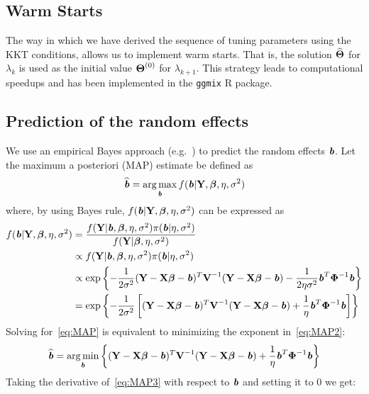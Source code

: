\subsection{Warm Starts}
The way in which we have derived the sequence of tuning parameters using the KKT conditions, allows us to implement warm starts. That is, the solution $\widehat{\boldsymbol{\Theta}}$ for $\lambda_k$ is used as the initial value $\boldsymbol{\Theta}^{(0)}$ for $\lambda_{k+1}$. This strategy leads to computational speedups and has been implemented in the \texttt{ggmix} R package. 

\subsection{Prediction of the random effects}
We use an empirical Bayes approach (e.g.~\cite{wakefield2013bayesian}) to predict the random effects $\textbf{\emph{b}}$. Let the maximum a posteriori (MAP) estimate be defined as
\begin{equation}
\widehat{\textbf{\emph{b}}} = \operatorname*{arg\,max}_{\textbf{\emph{b}}} f(\textbf{\emph{b}} |  \textbf{Y}, \boldsymbol{\beta}, \eta, \sigma^2)  \label{eq:MAP}
\end{equation}
where, by using Bayes rule, $f(\textbf{\emph{b}} |  \textbf{Y}, \boldsymbol{\beta}, \eta, \sigma^2)$ can be expressed as
\begin{align}
f(\textbf{\emph{b}} |  \textbf{Y}, \boldsymbol{\beta}, \eta, \sigma^2) & = \frac{f(\textbf{Y} | \textbf{\emph{b}},  \boldsymbol{\beta}, \eta, \sigma^2)  \pi(\textbf{\emph{b}} | \eta, \sigma^2)}{f(\textbf{Y} |  \boldsymbol{\beta}, \eta, \sigma^2)} \nonumber \\
& \propto f(\textbf{Y} | \textbf{\emph{b}},  \boldsymbol{\beta}, \eta, \sigma^2)  \pi(\textbf{\emph{b}} | \eta, \sigma^2) \nonumber\\
& \propto \exp \left\lbrace - \frac{1}{2 \sigma^2} (\textbf{Y} - \textbf{X} \boldsymbol{\beta} - \textbf{\emph{b}})^T \textbf{V}^{-1} (\textbf{Y} - \textbf{X} \boldsymbol{\beta} - \textbf{\emph{b}}) - \frac{1}{2\eta \sigma^2}\textbf{\emph{b}}^T \boldsymbol{\Phi}^{-1}\textbf{\emph{b}}   \right \rbrace \nonumber\\
& = \exp \left\lbrace - \frac{1}{2 \sigma^2} \left[  (\textbf{Y} - \textbf{X} \boldsymbol{\beta} - \textbf{\emph{b}})^T \textbf{V}^{-1} (\textbf{Y} - \textbf{X} \boldsymbol{\beta} - \textbf{\emph{b}}) + \frac{1}{\eta }\textbf{\emph{b}}^T \boldsymbol{\Phi}^{-1}\textbf{\emph{b}} \right]    \right \rbrace \label{eq:MAP2}
\end{align}
Solving for~\eqref{eq:MAP} is equivalent to minimizing the exponent in~\eqref{eq:MAP2}:
\begin{align}
\widehat{\textbf{\emph{b}}} = \operatorname*{arg\,min}_{\textbf{\emph{b}}} \left\lbrace  (\textbf{Y} - \textbf{X} \boldsymbol{\beta} - \textbf{\emph{b}})^T \textbf{V}^{-1} (\textbf{Y} - \textbf{X} \boldsymbol{\beta} - \textbf{\emph{b}}) + \frac{1}{\eta }\textbf{\emph{b}}^T \boldsymbol{\Phi}^{-1}\textbf{\emph{b}} \right\rbrace \label{eq:MAP3}
\end{align}
Taking the derivative of~\eqref{eq:MAP3} with respect to $\textbf{\emph{b}}$ and setting it to 0 we get:
